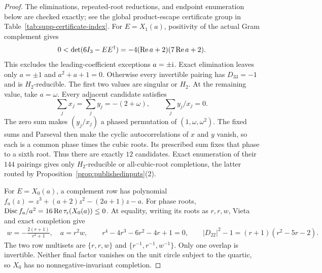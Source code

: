\begin{proof}
The eliminations, repeated-root reductions, and endpoint enumeration below are checked exactly; see the global product-escape certificate group in Table~\ref{tab:supp-certificate-index}.
{For $E=X_1(a)$, positivity of the actual Gram complement gives}
\begin{equation}
{0<\det(6I_3-EE^\dagger)=-4(\operatorname{Re}a+2)(7\operatorname{Re}a+2).}
\end{equation}
{This excludes the leading-coefficient exceptions $a=\pm\mathrm i$. Exact elimination leaves only $a=\pm1$ and $a^2+a+1=0$. Otherwise every invertible pairing has $D_{33}=-1$ and is $H_2$-reducible. The first two values are singular or $H_2$. At the remaining value, take $a=\omega$. Every adjacent candidate satisfies}
\begin{equation}
{\sum_jx_j=\sum_jy_j=-(2+\omega),
\qquad \sum_j y_j/x_j=0.}
\end{equation}
{The zero sum makes $(y_j/x_j)$ a phased permutation of $(1,\omega,\omega^2)$.  The fixed sums and Parseval then make the cyclic autocorrelations of $x$ and $y$ vanish, so each is a common phase times the cubic roots. Its prescribed sum fixes that phase to a sixth root.  Thus there are exactly $12$ candidates. Exact enumeration of their $144$ pairings gives only $H_2$-reducible or all-cubic-root completions, the latter routed by Proposition~\ref{prop:publishedinputs}(2).}

{For $E=X_0(a)$, a complement row has polynomial $f_a(z)=z^3+(a+2)z^2-(2a+1)z-a$.  For phase roots, $\operatorname{Disc}f_a/a^2=16\operatorname{Re}\tau_{\rm r}(X_0(a))\le0$.  At equality, writing its roots as $r,r,w$, Vieta and exact completion give}
\begin{equation}
{\begin{gathered}
w=-\frac{2(r+1)}{r^2+1},\quad
a=r^2w,\qquad
r^4-4r^3-6r^2-4r+1=0,\qquad
|D_{22}|^2-1=(r+1)(r^2-5r-2).
\end{gathered}}
\end{equation}
{The two row multisets are $\{r,r,w\}$ and $\{r^{-1},r^{-1},w^{-1}\}$. Only one overlap is invertible. Neither final factor vanishes on the unit circle subject to the quartic, so $X_0$ has no nonnegative-invariant completion.}


\end{proof}
